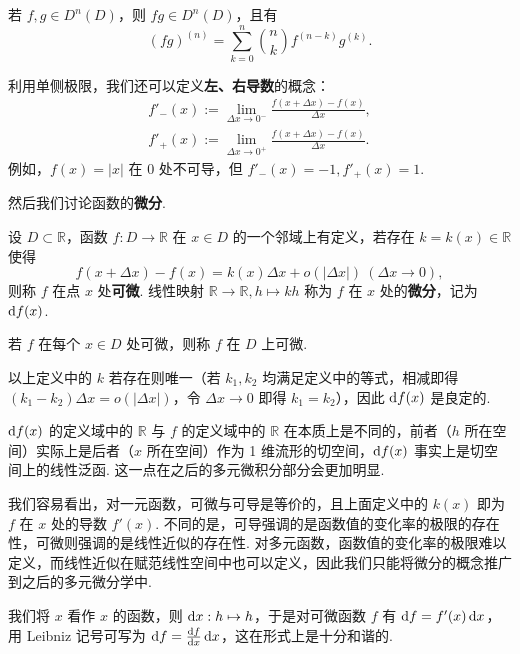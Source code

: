 \documentclass[../main.tex]{subfiles}
\begin{document}
\begin{proposition}[Leibniz 公式]
    若 $f, g \in D^n(D)$，则 $fg \in D^n(D)$，且有
    $$
    (fg)^{(n)} = \sum_{k = 0}^{n} \binom{n}{k} f^{(n - k)} g^{(k)}. 
    $$
\end{proposition}

利用单侧极限，我们还可以定义\textbf{左、右导数}的概念：
\begin{align*}
    f'_-(x) := \lim_{\Delta x \to 0^-} \frac{f(x + \Delta x) - f(x)}{\Delta x}, \\
    f'_+(x) := \lim_{\Delta x \to 0^+} \frac{f(x + \Delta x) - f(x)}{\Delta x}. 
\end{align*}
例如，$f(x) = |x|$ 在 $0$ 处不可导，但 $f'_-(x) = -1, f'_+(x) = 1$. 


然后我们讨论函数的\textbf{微分}. 

\begin{definition} \label{def:differential}
    设 $D \subset \mathbb R$，函数 $f:D \to \mathbb R$ 在 $x \in D$ 的一个邻域上有定义，若存在 $k = k(x) \in \mathbb R$ 使得
    $$
    f(x + \Delta x) - f(x) = k(x) \Delta x + o(|\Delta x|) \ (\Delta x \to 0), 
    $$
    则称 $f$ 在点 $x$ 处\textbf{可微}. 线性映射 $\mathbb R \to \mathbb R, h \mapsto kh$ 称为 $f$ 在 $x$ 处的\textbf{微分}，记为 $\mathrm{d} f(x)$. 
    
    若 $f$ 在每个 $x \in D$ 处可微，则称 $f$ 在 $D$ 上可微. 
\end{definition}

\begin{remark}
    以上定义中的 $k$ 若存在则唯一（若 $k_1, k_2$ 均满足定义中的等式，相减即得 $(k_1 - k_2)\Delta x = o(|\Delta x|)$，令 $\Delta x \to 0$ 即得 $k_1 = k_2$），因此 $\mathrm{d} f(x)$ 是良定的. 

    $\mathrm{d} f(x)$ 的定义域中的 $\mathbb R$ 与 $f$ 的定义域中的 $\mathbb R$ 在本质上是不同的，前者（$h$ 所在空间）实际上是后者（$x$ 所在空间）作为 1 维流形的切空间，$\mathrm{d} f(x)$ 事实上是切空间上的线性泛函. 这一点在之后的多元微积分部分会更加明显. 
\end{remark}

我们容易看出，对一元函数，可微与可导是等价的，且上面定义中的 $k(x)$ 即为 $f$ 在 $x$ 处的导数 $f'(x)$. 不同的是，可导强调的是函数值的变化率的极限的存在性，可微则强调的是线性近似的存在性. 对多元函数，函数值的变化率的极限难以定义，而线性近似在赋范线性空间中也可以定义，因此我们只能将微分的概念推广到之后的多元微分学中. 

我们将 $x$ 看作 $x$ 的函数，则 $\mathrm{d} x:h \mapsto h$，于是对可微函数 $f$ 有 $\mathrm{d} f = f'(x) \,\mathrm{d} x$，用 Leibniz 记号可写为 $\mathrm{d} f = \frac{\mathrm{d} f}{\mathrm{d} x} \,\mathrm{d} x$，这在形式上是十分和谐的. 
\end{document}
